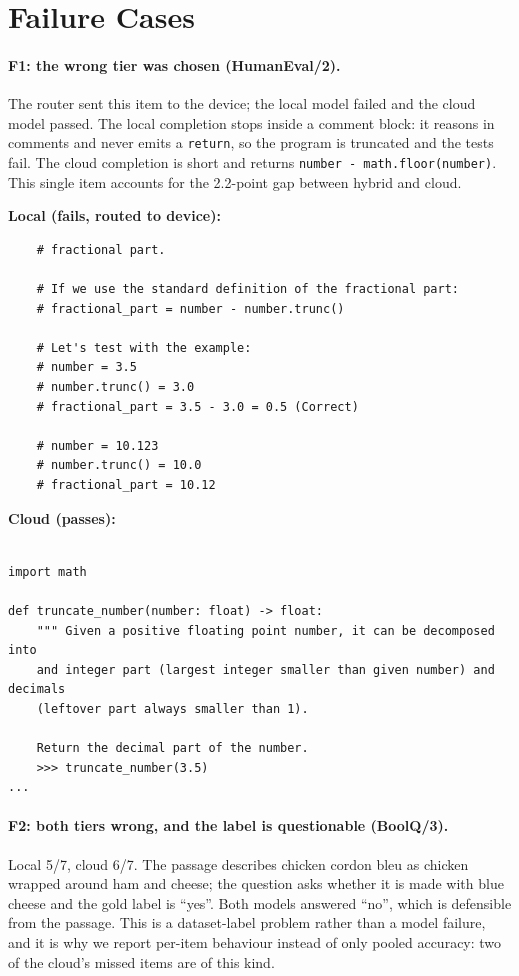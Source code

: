 \documentclass[11pt,a4paper]{article}
\begin{document}
\section{Failure Cases}

\paragraph{F1: the wrong tier was chosen (HumanEval/2).}
The router sent this item to the device; the local model failed and the cloud
model passed. The local completion stops inside a comment block: it reasons in comments
and never emits a \texttt{return}, so the program is truncated and the tests
fail. The cloud
completion is short and returns
\texttt{number - math.floor(number)}. This single item accounts for the
2.2-point gap between hybrid and cloud.

\noindent\textbf{Local (fails, routed to device):}
{\footnotesize
\begin{verbatim}
    # fractional part.

    # If we use the standard definition of the fractional part:
    # fractional_part = number - number.trunc()

    # Let's test with the example:
    # number = 3.5
    # number.trunc() = 3.0
    # fractional_part = 3.5 - 3.0 = 0.5 (Correct)

    # number = 10.123
    # number.trunc() = 10.0
    # fractional_part = 10.12
\end{verbatim}}

\noindent\textbf{Cloud (passes):}
{\footnotesize
\begin{verbatim}

import math

def truncate_number(number: float) -> float:
    """ Given a positive floating point number, it can be decomposed into
    and integer part (largest integer smaller than given number) and decimals
    (leftover part always smaller than 1).

    Return the decimal part of the number.
    >>> truncate_number(3.5)
...
\end{verbatim}}

\paragraph{F2: both tiers wrong, and the label is questionable (BoolQ/3).}
Local 5/7, cloud 6/7. The passage describes chicken cordon
bleu as chicken wrapped around ham and cheese; the question asks whether it is
made with blue cheese and the gold label is ``yes''. Both models answered
``no'', which is defensible from the passage. This is a dataset-label problem
rather than a model failure, and it is why we report per-item behaviour instead
of only pooled accuracy: two of the cloud's missed items are of this kind.
\end{document}
